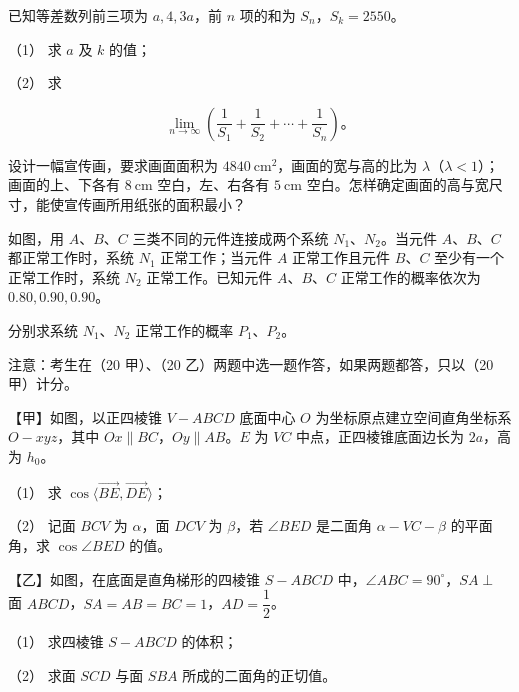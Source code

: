 \begin{question}
已知等差数列前三项为 $a,4,3a$，前 $n$ 项的和为 $S_n$，$S_k=2550$。

（1） 求 $a$ 及 $k$ 的值；

（2） 求

\nopagebreak[4]
\[
\lim_{n\to\infty}\left(\frac1{S_1}+\frac1{S_2}+\cdots+\frac1{S_n}\right)。
\]

\end{question}
\begin{question}
设计一幅宣传画，要求画面面积为 $4840\ \mathrm{cm}^2$，画面的宽与高的比为 $\lambda$（$\lambda<1$）；画面的上、下各有 $8\ \mathrm{cm}$ 空白，左、右各有 $5\ \mathrm{cm}$ 空白。怎样确定画面的高与宽尺寸，能使宣传画所用纸张的面积最小？

\Needspace{0.4\textheight}
\end{question}
\begin{question}
如图，用 $A$、$B$、$C$ 三类不同的元件连接成两个系统 $N_1$、$N_2$。当元件 $A$、$B$、$C$ 都正常工作时，系统 $N_1$ 正常工作；当元件 $A$ 正常工作且元件 $B$、$C$ 至少有一个正常工作时，系统 $N_2$ 正常工作。已知元件 $A$、$B$、$C$ 正常工作的概率依次为 $0.80,0.90,0.90$。
\nopagebreak[4]
\begin{center}\end{center}
\nopagebreak[4]
分别求系统 $N_1$、$N_2$ 正常工作的概率 $P_1$、$P_2$。

\Needspace{0.4\textheight}
\end{question}
\begin{question}
注意：考生在（20 甲）、（20 乙）两题中选一题作答，如果两题都答，只以（20 甲）计分。

【甲】如图，以正四棱锥 $V-ABCD$ 底面中心 $O$ 为坐标原点建立空间直角坐标系 $O-xyz$，其中 $Ox\parallel BC$，$Oy\parallel AB$。$E$ 为 $VC$ 中点，正四棱锥底面边长为 $2a$，高为 $h_0$。
\nopagebreak[4]
\begin{center}\end{center}
\nopagebreak[4]
（1） 求 $\cos\langle\overrightarrow{BE},\overrightarrow{DE}\rangle$；

（2） 记面 $BCV$ 为 $\alpha$，面 $DCV$ 为 $\beta$，若 $\angle BED$ 是二面角 $\alpha-VC-\beta$ 的平面角，求 $\cos\angle BED$ 的值。

【乙】如图，在底面是直角梯形的四棱锥 $S-ABCD$ 中，$\angle ABC=90^\circ$，$SA\perp$ 面 $ABCD$，$SA=AB=BC=1$，$AD=\dfrac12$。
\nopagebreak[4]
\begin{center}\end{center}
\nopagebreak[4]
（1） 求四棱锥 $S-ABCD$ 的体积；

（2） 求面 $SCD$ 与面 $SBA$ 所成的二面角的正切值。

\end{question}
